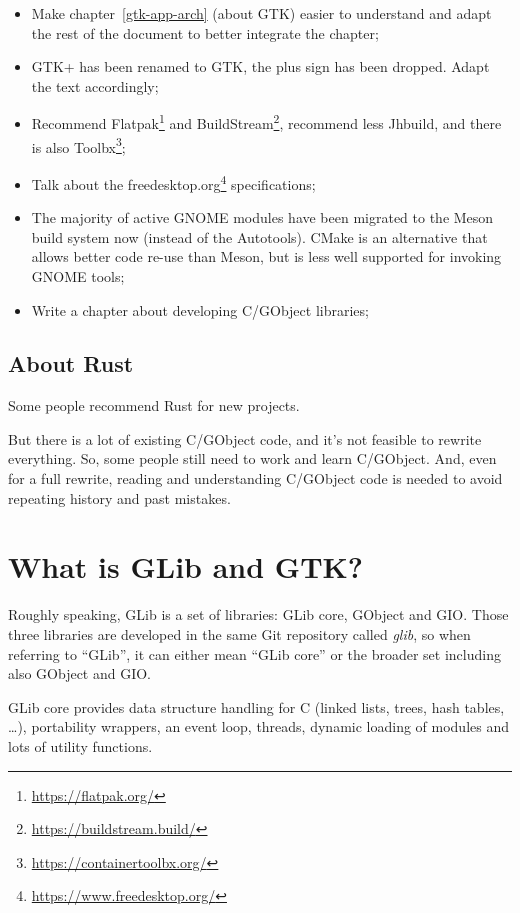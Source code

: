 \begin{itemize}
  \item Make chapter~\ref{gtk-app-arch} (about GTK) easier to understand and adapt the rest of the document to better integrate the chapter;
  \item GTK+ has been renamed to GTK, the plus sign has been dropped. Adapt the text accordingly;
  \item Recommend Flatpak\footnote{\url{https://flatpak.org/}} and BuildStream\footnote{\url{https://buildstream.build/}}, recommend less Jhbuild, and there is also Toolbx\footnote{\url{https://containertoolbx.org/}};
  \item Talk about the freedesktop.org\footnote{\url{https://www.freedesktop.org/}} specifications;
  \item The majority of active GNOME modules have been migrated to the Meson build system now (instead of the Autotools). CMake is an alternative that allows better code re-use than Meson, but is less well supported for invoking GNOME tools;
  \item Write a chapter about developing C/GObject libraries;
\end{itemize}

\subsection{About Rust}

Some people recommend Rust for new projects.

But there is a lot of existing C/GObject code, and it's not feasible to rewrite everything. So, some people still need to work and learn C/GObject. And, even for a full rewrite, reading and understanding C/GObject code is needed to avoid repeating history and past mistakes.

\section{What is GLib and GTK?}

Roughly speaking, GLib is a set of libraries: GLib core, GObject and GIO. Those three libraries are developed in the same Git repository called \emph{glib}, so when referring to ``GLib'', it can either mean ``GLib core'' or the broader set including also GObject and GIO.

GLib core provides data structure handling for C (linked lists, trees, hash tables, …), portability wrappers, an event loop, threads, dynamic loading of modules and lots of utility functions.


